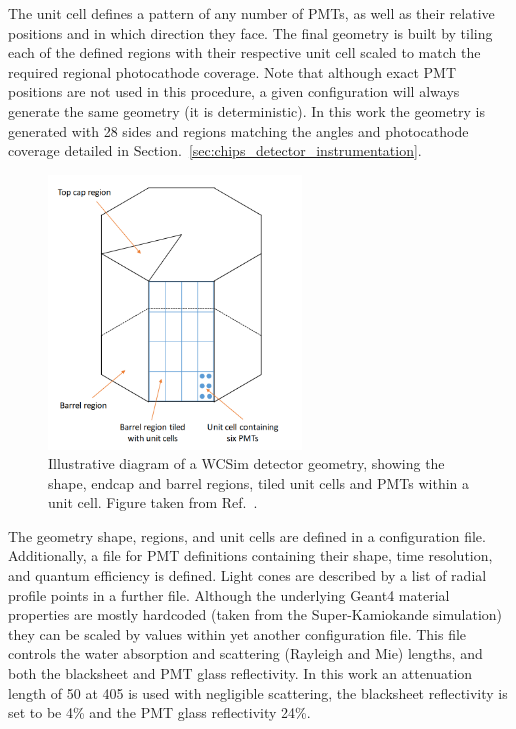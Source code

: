 The unit cell defines a pattern of any number of PMTs, as well as their relative positions and in
which direction they face. The final geometry is built by tiling each of the defined regions with
their respective unit cell scaled to match the required regional photocathode coverage. Note that
although exact PMT positions are not used in this procedure, a given configuration will always
generate the same geometry (it is deterministic). In this work the \chipsfive geometry is
generated with 28 sides and regions matching the angles and photocathode coverage detailed in
Section.~\ref{sec:chips_detector_instrumentation}.

\begin{figure} %
    \includegraphics[width=0.6\textwidth]{diagrams/4-chips/sim_geom.png}
    \caption[Illustrative diagram of a WCSim detector geometry.]
    {Illustrative diagram of a WCSim detector geometry, showing the shape, endcap and barrel
        regions, tiled unit cells and PMTs within a unit cell. Figure taken from
        Ref.~\cite{blake2016}.}
    \label{fig:sim_geom}
\end{figure}

The geometry shape, regions, and unit cells are defined in a configuration file. Additionally, a
file for PMT definitions containing their shape, time resolution, and quantum efficiency is
defined. Light cones are described by a list of radial profile points in a further file. Although
the underlying Geant4 material properties are mostly hardcoded (taken from the Super-Kamiokande
simulation) they can be scaled by values within yet another configuration file. This file controls
the water absorption and scattering (Rayleigh and Mie) lengths, and both the blacksheet and PMT
glass reflectivity. In this work an attenuation length of \unit{50}{} at
\unit{405}{} is used with negligible scattering, the blacksheet reflectivity is set to
be 4\% and the PMT glass reflectivity 24\%.

